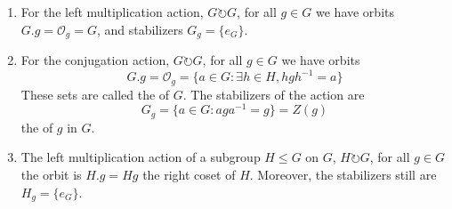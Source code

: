 \begin{eg}
        \leavevmode
        \begin{enumerate}
                \item For the left multiplication action, $G \circlearrowright G$, for all $g \in G$ we have orbits $G.g = \mathcal{O}_g = G$, and stabilizers $G_g = \{e_G\}$.
                \item For the conjugation action, $G \circlearrowright G$, for all $g \in G$ we have orbits \begin{equation}
                                G.g = \mathcal{O}_g = \{a \in G:\exists h \in H, hgh^{-1} = a\}
                \end{equation}
                        These sets are called the  of $G$. The stabilizers of the action are \begin{equation}
                                G_g = \{a \in G: aga^{-1} = g\} = Z(g)
                        \end{equation}
                        the  of $g$ in $G$.
                \item The left multiplication action of a subgroup $H \leq G$ on $G$, $H \circlearrowright G$, for all $g \in G$ the orbit is $H.g = Hg$ the right coset of $H$. Moreover, the stabilizers still are $H_g = \{e_G\}$.
        \end{enumerate}
\end{eg}

